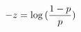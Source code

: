 \documentclass[preview]{standalone}
\begin{document}
\begin{align*}
\special{dvisvgm:raw <g id='unique000'>}-z=\log{(\frac{1-p}{p}})\special{dvisvgm:raw </g>}
\end{align*}
\end{document}
